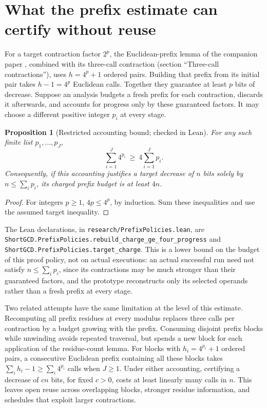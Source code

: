 \documentclass[11pt]{article}
\newtheorem{proposition}{Proposition}
\newcommand{\lean}[1]{\nolinkurl{#1}}
\begin{document}
\section{What the prefix estimate can certify without reuse}

For a target contraction factor $2^p$, the Euclidean-prefix lemma of the
companion paper \cite{companion}, combined with its three-call contraction
(section ``Three-call contractions''), uses $h=4^p+1$ ordered pairs. Building
that prefix from its initial pair takes $h-1=4^p$ Euclidean calls. Together
they guarantee at least $p$ bits of decrease.
Suppose an analysis budgets a fresh prefix for each contraction, discards it
afterwards, and accounts for progress only by these guaranteed factors.
It may choose a different positive integer $p_i$ at every stage.

\begin{proposition}[Restricted accounting bound; checked in Lean]
For any such finite list $p_1,\ldots,p_J$,
\[
\sum_{i=1}^J4^{p_i}\ \geq\ 4\sum_{i=1}^Jp_i.
\]
Consequently, if this accounting justifies a target decrease of $n$ bits
solely by $n\leq\sum_i p_i$, its charged prefix budget is at least $4n$.
\end{proposition}
\begin{proof}
For integers $p\geq1$, $4p\leq4^p$, by induction. Sum these inequalities
and use the assumed target inequality.
\end{proof}

The Lean declarations, in \texttt{research/PrefixPolicies.lean}, are
\lean{ShortGCD.PrefixPolicies.rebuild_charge_ge_four_progress} and
\lean{ShortGCD.PrefixPolicies.target_charge}. This is a lower bound on the
budget of this proof policy, not on actual executions: an actual successful
run need not satisfy $n\leq\sum_i p_i$, since its contractions may be much
stronger than their guaranteed factors, and the prototype reconstructs only
its selected operands rather than a fresh prefix at every stage.

Two related attempts have the same limitation at the level of this estimate.
Recomputing all prefix residues at every modulus replaces three calls per
contraction by a budget growing with the prefix. Consuming disjoint prefix
blocks while unwinding avoids repeated traversal, but spends a new block for
each application of the residue-count lemma. For blocks with $h_i=4^{p_i}+1$
ordered pairs, a consecutive Euclidean prefix containing all these blocks
takes $\sum_i h_i-1\geq\sum_i4^{p_i}$ calls when $J\geq1$.
Under either accounting, certifying a decrease of $cn$ bits, for fixed
$c>0$, costs at least linearly many calls in $n$. This leaves open reuse across overlapping blocks,
stronger residue information, and schedules that exploit larger contractions.
\end{document}
